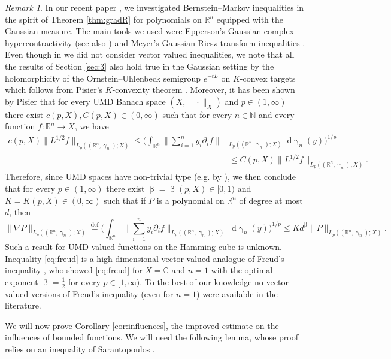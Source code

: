 \documentclass[11pt,reqno]{amsart}
\renewcommand{\leq}{\leqslant}
\renewcommand{\gamma}{\upgamma}
\newcommand{\R}{\mathbb R}
\newcommand{\1}{\mathbf 1}
\theoremstyle{remark}
\newtheorem{remark}[theorem]{Remark}
\newcommand{\C}{\mathbb C}
\newcommand{\N}{\mathbb N}
\newcommand{\eqdef}{\stackrel{\mathrm{def}}{=}}
\renewcommand{\gamma}{\upgamma}
\renewcommand{\beta}{\upbeta}
\newcommand*\diff{\mathop{}\!\mathrm{d}}
\begin{document}
\begin{remark}
In our recent paper \cite{EI18}, we investigated Bernstein--Markov inequalities in the spirit of Theorem \ref{thm:gradR} for polynomials on $\R^n$ equipped with the Gaussian measure. The main tools we used were Epperson's Gaussian complex hypercontractivity \cite{Epp89} (see also \cite{Jan97}) and Meyer's Gaussian Riesz transform inequalities \cite{Mey84}. Even though in \cite{EI18} we did not consider vector valued inequalities, we note that all the results of Section \ref{sec:3} also hold true in the Gaussian setting by the holomorphicity of the Ornstein--Uhlenbeck semigroup $e^{-tL}$ on $K$-convex targets which follows from Pisier's $K$-convexity theorem \cite{Pis82}. Moreover, it has been shown by Pisier \cite{Pis88} that for every UMD Banach space $(X,\|\cdot\|_X)$ and $p\in(1,\infty)$ there exist $c(p,X),C(p,X)\in(0,\infty)$ such that for every $n\in\N$ and every function $f:\R^n\to X$, we have
\begin{equation}
\begin{split}
c(p,X)\|L^{1/2}f\|_{L_p((\R^n,\gamma_n);X)} \leq \Big( \int_{\R^n} \Big\|\sum_{i=1}^n y_i\partial_i f\Big\|&_{L_p((\R^n,\gamma_n);X)} \diff\gamma_n(y)\Big)^{1/p}
\\ & \leq C(p,X) \|L^{1/2}f\|_{L_p((\R^n,\gamma_n);X)}.
\end{split}
\end{equation}
Therefore, since UMD spaces have non-trivial type (e.g. by \cite{Pis73}), we then conclude that for every $p\in(1,\infty)$ there exist $\beta=\beta(p,X)\in[0,1)$ and $K=K(p,X)\in(0,\infty)$ such that if $P$ is a polynomial on $\R^n$ of degree at most $d$, then
\begin{equation} \label{eq:freud}
\|\nabla P\|_{L_p((\R^n,\gamma_n);X)} \eqdef \Big( \int_{\R^n} \Big\|\sum_{i=1}^n y_i\partial_i f\Big\|_{L_p((\R^n,\gamma_n);X)} \diff\gamma_n(y)\Big)^{1/p} \leq K d^{\beta} \|P\|_{L_p((\R^n,\gamma_n);X)}.
\end{equation}
Such a result for UMD-valued functions on the Hamming cube is unknown. Inequality \eqref{eq:freud} is a high dimensional vector valued analogue of Freud's inequality \cite{Fre71}, who showed \eqref{eq:freud} for $X=\C$ and $n=1$ with the optimal exponent $\beta=\frac{1}{2}$ for every $p\in[1,\infty)$. To the best of our knowledge no vector valued versions of Freud's inequality (even for $n=1$) were available in the literature.
\end{remark}

We will now prove Corollary \ref{cor:influences}, the improved estimate on the influences of bounded functions. We will need the following lemma, whose proof relies on an inequality of Sarantopoulos \cite{Sar91}.
\end{document}
